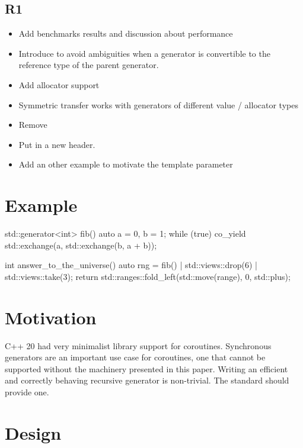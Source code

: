 \documentclass{wg21}
\begin{document}
\subsection{R1}
\begin{itemize}
\item Add benchmarks results and discussion about performance
\item Introduce  to avoid ambiguities when a generator is convertible to the reference type of the parent generator.
\item Add allocator support
\item Symmetric transfer works with generators of different value / allocator types
\item Remove 
\item Put  in a new  header.
\item Add an other example to motivate the  template parameter
\end{itemize}


\section{Example}

\begin{colorblock}
    std::generator<int> fib() {
        auto a = 0, b = 1;
        while (true) {
            co_yield std::exchange(a, std::exchange(b, a + b));
        }
    }

    int answer_to_the_universe() {
        auto rng = fib() | std::views::drop(6) | std::views::take(3);
        return std::ranges::fold_left(std::move(range), 0, std::plus{});
    }
\end{colorblock}


\section{Motivation}

C++ 20 had very minimalist library support for coroutines.
Synchronous generators are an important use case for coroutines, one that cannot be supported without
the machinery presented in this paper.
Writing an efficient and correctly behaving recursive generator is non-trivial. The standard should provide one.


\section{Design}
\end{document}
